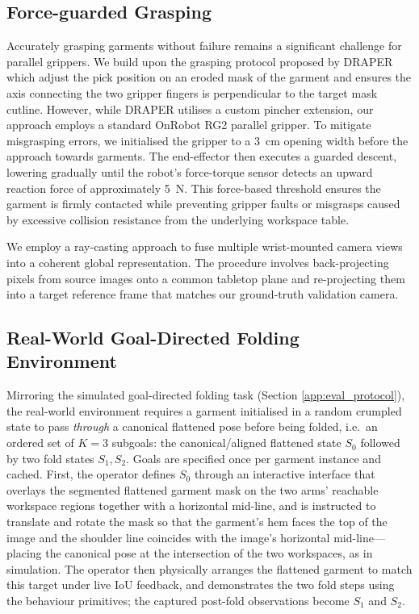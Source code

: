 \documentclass[journal]{IEEEtran}
\begin{document}
\subsection{Force-guarded Grasping} \label{sec:grasping}

Accurately grasping garments without failure remains a significant challenge for parallel grippers. We build upon the grasping protocol proposed by DRAPER \cite{kadi2025draper} which adjust the pick position on an eroded mask of the garment and ensures the axis connecting the two gripper fingers is perpendicular to the target mask cutline. However, while DRAPER utilises a custom pincher extension, our approach employs a standard OnRobot RG2 parallel gripper. To mitigate misgrasping errors, we initialised the gripper to a 3~cm opening width before the approach towards garments. The end-effector then executes a guarded descent, lowering gradually until the robot's force-torque sensor detects an upward reaction force of approximately 5~N. This force-based threshold ensures the garment is firmly contacted while preventing gripper faults or misgrasps caused by excessive collision resistance from the underlying workspace table.

We employ a ray-casting approach to fuse multiple wrist-mounted camera views into a coherent global representation. The procedure involves back-projecting pixels from source images onto a common tabletop plane and re-projecting them into a target reference frame that matches our ground-truth validation camera.

\subsection{Real-World Goal-Directed Folding Environment} \label{sec:real-world-folding-env}

Mirroring the simulated goal-directed folding task (Section \ref{app:eval_protocol}), the real-world environment requires a garment initialised in a random crumpled state to pass \emph{through} a canonical flattened pose before being folded, i.e.\ an ordered set of $K=3$ subgoals: the canonical/aligned flattened state $S_0$ followed by two fold states $S_1, S_2$. Goals are specified once per garment instance and cached. First, the operator defines $S_0$ through an interactive interface that overlays the segmented flattened garment mask on the two arms' reachable workspace regions together with a horizontal mid-line, and is instructed to translate and rotate the mask so that the garment's hem faces the top of the image and the shoulder line coincides with the image's horizontal mid-line---placing the canonical pose at the intersection of the two workspaces, as in simulation. The operator then physically arranges the flattened garment to match this target under live IoU feedback, and demonstrates the two fold steps using the behaviour primitives; the captured post-fold observations become $S_1$ and $S_2$.
\end{document}
